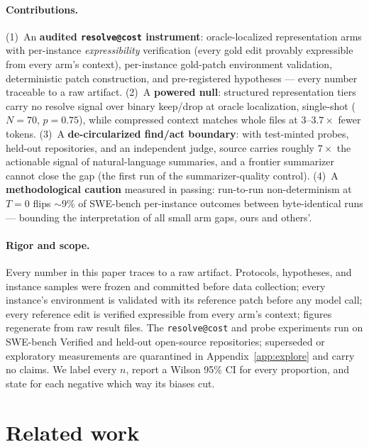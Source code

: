 \documentclass{article}
\makeatletter
\newcommand{\resolveatcost}{\texttt{resolve@cost}}
\makeatother
\begin{document}
\paragraph{Contributions.}
(1)~An \textbf{audited \resolveatcost{} instrument}: oracle-localized representation arms
with per-instance \emph{expressibility} verification (every gold edit provably expressible from
every arm's context), per-instance gold-patch environment validation, deterministic patch
construction, and pre-registered hypotheses --- every number traceable to a raw artifact.
(2)~A \textbf{powered null}: structured representation tiers carry no resolve signal over binary
keep/drop at oracle localization, single-shot ($N{=}70$, $p{=}0.75$), while compressed context
matches whole files at $3$--$3.7\times$ fewer tokens.
(3)~A \textbf{de-circularized find/act boundary}: with test-minted probes, held-out repositories,
and an independent judge, source carries roughly $7\times$ the actionable signal of
natural-language summaries, and a frontier summarizer cannot close the gap (the first run of the
summarizer-quality control).
(4)~A \textbf{methodological caution} measured in passing: run-to-run non-determinism at $T{=}0$
flips ${\sim}9\%$ of SWE-bench per-instance outcomes between byte-identical runs --- bounding the
interpretation of all small arm gaps, ours and others'.

\paragraph{Rigor and scope.} Every number in this paper traces to a raw artifact. Protocols,
hypotheses, and instance samples were frozen and committed before data collection; every
instance's environment is validated with its reference patch before any model call; every
reference edit is verified expressible from every arm's context; figures regenerate from raw
result files. The \resolveatcost{} and probe experiments run on SWE-bench Verified and held-out open-source
repositories; superseded or exploratory measurements are quarantined in Appendix~\ref{app:explore}
and carry no claims. We
label every $n$, report a Wilson 95\% CI for every proportion, and state for each negative which
way its biases cut.

\section{Related work}
\label{sec:related}
\end{document}
